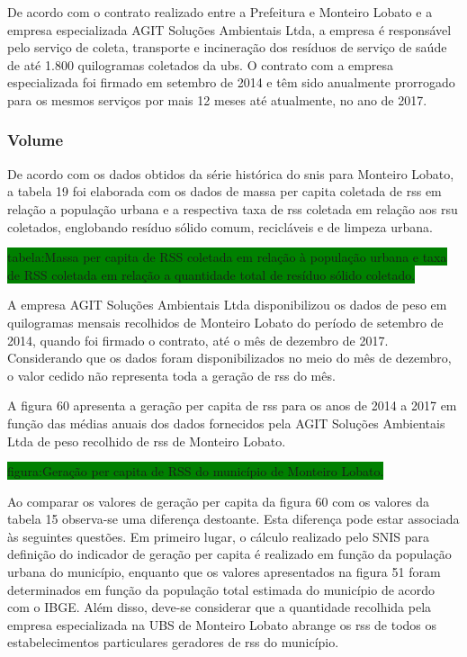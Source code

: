 	De acordo com o contrato realizado entre a Prefeitura e Monteiro Lobato e a empresa especializada AGIT Soluções Ambientais Ltda, a empresa é responsável pelo serviço de coleta, transporte e incineração dos resíduos de serviço de saúde de até 1.800 quilogramas coletados da \acrshort{ubs}.
	O contrato com a empresa especializada foi firmado em setembro de 2014 e têm sido anualmente prorrogado para os mesmos serviços por mais 12 meses até atualmente, no ano de 2017.
	
	\subsubsection{Volume}
	De acordo com os dados obtidos da série histórica do \gls{snis} para Monteiro Lobato, a tabela 19 foi elaborada com os dados de massa per capita coletada de \gls{rss} em relação a população urbana e a respectiva taxa de \gls{rss} coletada em relação aos \gls{rsu} coletados, englobando resíduo sólido comum, recicláveis e de limpeza urbana.
	
	\colorbox{green}{tabela:Massa per capita de RSS coletada em relação à população urbana e taxa de RSS coletada em relação a quantidade total de resíduo sólido coletado.}
	
	A empresa AGIT Soluções Ambientais Ltda disponibilizou os dados de peso em quilogramas mensais recolhidos de Monteiro Lobato do período de setembro de 2014, quando foi firmado o contrato, até o mês de dezembro de 2017. Considerando que os dados foram disponibilizados no meio do mês de dezembro, o valor cedido não representa toda a geração de \gls{rss} do mês.
	
	A figura 60 apresenta a geração per capita de \gls{rss} para os anos de 2014 a 2017 em função das médias anuais dos dados fornecidos pela AGIT Soluções Ambientais Ltda de peso recolhido de \gls{rss} de Monteiro Lobato.
	
	\colorbox{green}{figura:Geração per capita de RSS do município de Monteiro Lobato.}
	
	Ao comparar os valores de geração per capita da figura 60 com os valores da tabela 15 observa-se uma diferença destoante. Esta diferença pode estar associada às seguintes questões. Em primeiro lugar, o cálculo realizado pelo SNIS para definição do indicador de geração per capita é realizado em função da população urbana do município, enquanto que os valores apresentados na figura 51 foram determinados em função da população total estimada do município de acordo com o IBGE. Além disso, deve-se considerar que a quantidade recolhida pela empresa especializada na UBS de Monteiro Lobato abrange os \gls{rss} de todos os estabelecimentos particulares geradores de \gls{rss} do município. 
	
